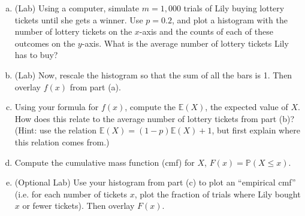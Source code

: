 \documentclass[]{article}
\newif\ifsolutions
\renewcommand{\answer}[1]{{\color{mydarkblue}\textbf{Solution:}#1}}
\begin{document}
\begin{qunlist}
\begin{enumerate}[a)]
\qpart
\item (Lab) Using a computer, simulate $m=1,000$ trials of Lily buying lottery tickets until she gets a winner. Use $p=0.2$, and plot a histogram with the number of lottery tickets on the $x$-axis and the counts of each of these outcomes on the $y$-axis.  What is the average number of lottery tickets Lily has to buy?

\qpart
\item (Lab) Now, rescale the histogram so that the sum of all the bars is 1.  Then overlay $f(x)$ from part (a).

\qpart
\item Using your formula for $f(x)$, compute the $\mathbb{E}(X)$, the expected value of $X$. How does this relate to the average number of lottery tickets from part (b)? (Hint: use the relation $\mathbb{E}(X) = (1-p) \mathbb{E}(X) + 1$, but first explain where this relation comes from.) %


\qpart
\item Compute the cumulative mass function (cmf) for $X$, $F(x) = \mathbb{P}(X \leq x)$.

\ifsolutions{ \answer{ 
	We can use the formula for a finite geometric series to find $F(x)$,
	\[ F(x) = p \sum_{y=1}^x (1-p)^{y-1} = p \cdot \frac{1 - (1-p)^x}{1 - (1-p)} = 1 - (1-p)^x. \]
}}\fi

\qpart
\item (Optional Lab) Use your histogram from part (c) to plot an ``empirical cmf'' (i.e. for each number of tickets $x$, plot the fraction of trials where Lily bought $x$ or fewer tickets). Then overlay $F(x)$.

\end{enumerate}






\end{qunlist}
\end{document}
